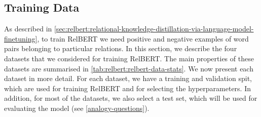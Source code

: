 \documentclass[3p]{elsarticle}
\begin{document}
{\subsection{Training Data} \label{sec:relbert:dataset}
As described in \autoref{sec:relbert:relational-knowledge-distillation-via-language-model-finetuning}, to train RelBERT we need positive and negative examples of word pairs belonging to particular relations.
In this section, we describe the four datasets that we considered for training RelBERT. The main properties of these datasets are summarised in \autoref{tab:relbert:relbert-data-stats}.
We now present each dataset in more detail. For each dataset, we have a training and validation spit, which are used for training RelBERT and for selecting the hyperparameters. In addition, for most of the datasets, we also select a test set, which will be used for evaluating the model (see \autoref{analogy-questions}).

}
\end{document}
